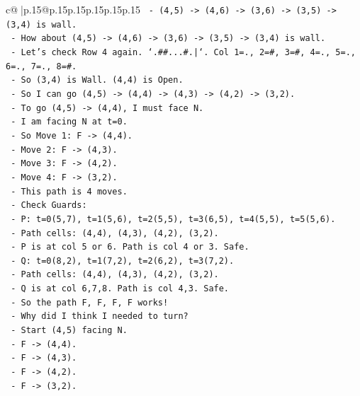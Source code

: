 \documentclass{article}
\begin{document}
{\begin{supertabular}{c@{$\;$}|p{.15\linewidth}@{}p{.15\linewidth}p{.15\linewidth}p{.15\linewidth}p{.15\linewidth}p{.15\linewidth}}
{{{\texttt{         {-} (4,5) {-}> (4,6) {-}> (3,6) {-}> (3,5) {-}> (3,4) is wall.} \\
\texttt{         {-} How about (4,5) {-}> (4,6) {-}> (3,6) {-}> (3,5) {-}> (3,4) is wall.} \\
\texttt{         {-} Let's check Row 4 again. `.\#\#...\#.|`. Col 1=., 2=\#, 3=\#, 4=., 5=., 6=., 7=., 8=\#.} \\
\texttt{         {-} So (3,4) is Wall. (4,4) is Open.} \\
\texttt{         {-} So I can go (4,5) {-}> (4,4) {-}> (4,3) {-}> (4,2) {-}> (3,2).} \\
\texttt{         {-} To go (4,5) {-}> (4,4), I must face N.} \\
\texttt{         {-} I am facing N at t=0.} \\
\texttt{         {-} So Move 1: F {-}> (4,4).} \\
\texttt{         {-} Move 2: F {-}> (4,3).} \\
\texttt{         {-} Move 3: F {-}> (4,2).} \\
\texttt{         {-} Move 4: F {-}> (3,2).} \\
\texttt{         {-} This path is 4 moves.} \\
\texttt{         {-} Check Guards:} \\
\texttt{           {-} P: t=0(5,7), t=1(5,6), t=2(5,5), t=3(6,5), t=4(5,5), t=5(5,6).} \\
\texttt{             {-} Path cells: (4,4), (4,3), (4,2), (3,2).} \\
\texttt{             {-} P is at col 5 or 6. Path is col 4 or 3. Safe.} \\
\texttt{           {-} Q: t=0(8,2), t=1(7,2), t=2(6,2), t=3(7,2).} \\
\texttt{             {-} Path cells: (4,4), (4,3), (4,2), (3,2).} \\
\texttt{             {-} Q is at col 6,7,8. Path is col 4,3. Safe.} \\
\texttt{         {-} So the path F, F, F, F works!} \\
\texttt{         {-} Why did I think I needed to turn?} \\
\texttt{         {-} Start (4,5) facing N.} \\
\texttt{         {-} F {-}> (4,4).} \\
\texttt{         {-} F {-}> (4,3).} \\
\texttt{         {-} F {-}> (4,2).} \\
\texttt{         {-} F {-}> (3,2).} \\
}}}
\end{supertabular}}
\end{document}
